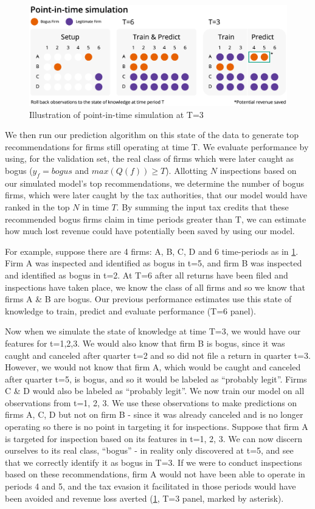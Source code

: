 \begin{figure}
  \includegraphics[width=1\columnwidth]{figures/PointInTimeModel.png}
  \caption{Illustration of point-in-time simulation at T=3}
  \label{fig:PointInTimeSchematic}
\end{figure}

We then run our prediction algorithm on this state of the data to generate top recommendations for firms still operating at time T. We evaluate performance by using, for the validation set, the real class of firms which were later caught as bogus ($y_f=bogus$ and $max(Q(f)) \ge T$). Allotting $N$ inspections based on our simulated model's top recommendations, we determine the number of bogus firms, which were later caught by the tax authorities, that our model would have ranked in the top $N$ in time $T$. By summing the input tax credits that these recommended bogus firms claim in time periods greater than T, we can estimate how much lost revenue could have potentially been saved by using our model.

For example, suppose there are 4 firms: A, B, C, D and 6 time-periods as in \cref{fig:PointInTimeSchematic}. Firm A was inspected and identified as bogus in t=5, and firm B was inspected and identified as bogus in t=2. At T=6 after all returns have been filed and inspections have taken place, we know the class of all firms and so we know that firms A \& B are bogus. Our previous performance estimates use this state of knowledge to train, predict and evaluate performance (T=6 panel). 

Now when we simulate the state of knowledge at time T=3, we would have our features for t=1,2,3. We would also know that firm B is bogus, since it was caught and canceled after quarter t=2 and so did not file a return in quarter t=3. However, we would not know that firm A, which would be caught and canceled after quarter t=5, is bogus, and so it would be labeled as ``probably legit''. Firms C \& D would also be labeled as ``probably legit''. We now train our model on all observations from t=1, 2, 3. We use these observations to make predictions on firms A, C, D but not on firm B - since it was already canceled and is no longer operating so there is no point in targeting it for inspections. Suppose that firm A is targeted for inspection based on its features in t=1, 2, 3. We can now discern ourselves to its real class, ``bogus'' - in reality only discovered at t=5, and see that we correctly identify it as bogus in T=3. If we were to conduct inspections based on these recommendations, firm A would not have been able to operate in periods 4 and 5, and the tax evasion it facilitated in those periods would have been avoided and revenue loss averted (\cref{fig:PointInTimeSchematic}, T=3 panel, marked by asterisk). 

